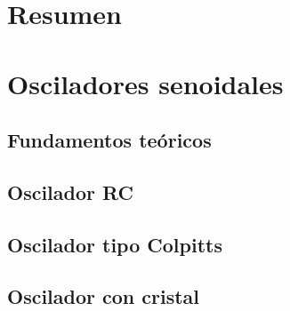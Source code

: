 \documentclass[12pt,letterpaper]{article}
\begin{document}
\begin{titlepage}
                
\end{titlepage}


{
  \hypersetup{linkcolor=black}
  \tableofcontents
}

\section*{Resumen}

\setlength{\parindent}{12pt}

\bigskip

\newpage
\section{Osciladores senoidales}
   \subsection{Fundamentos teóricos}
      
      \newpage
   \subsection{Oscilador RC}
      
      \newpage
\subsection{Oscilador tipo Colpitts}
      
      \newpage
\subsection{Oscilador con cristal}
      

\bigskip
           \newpage
                   \printbibliography 
\bigskip
\end{document}
